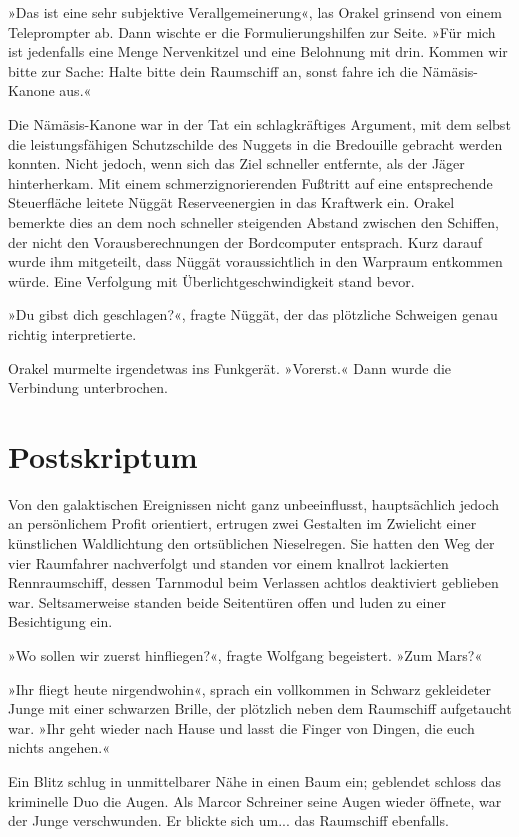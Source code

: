 »Das ist eine sehr subjektive Verallgemeinerung«, las Orakel grinsend von einem Teleprompter ab. Dann wischte er die Formulierungshilfen zur Seite. »Für mich ist jedenfalls eine Menge Nervenkitzel und eine Belohnung mit drin. Kommen wir bitte zur Sache: Halte bitte dein Raumschiff an, sonst fahre ich die Nämäsis-Kanone aus.«

Die Nämäsis-Kanone war in der Tat ein schlagkräftiges Argument, mit dem selbst die leistungsfähigen Schutzschilde des Nuggets in die Bredouille gebracht werden konnten. Nicht jedoch, wenn sich das Ziel schneller entfernte, als der Jäger hinterherkam. Mit einem schmerzignorierenden Fußtritt auf eine entsprechende Steuerfläche leitete Nüggät Reserveenergien in das Kraftwerk ein. Orakel bemerkte dies an dem noch schneller steigenden Abstand zwischen den Schiffen, der nicht den Vorausberechnungen der Bordcomputer entsprach. Kurz darauf wurde ihm mitgeteilt, dass Nüggät voraussichtlich in den Warpraum entkommen würde. Eine Verfolgung mit Überlichtgeschwindigkeit stand bevor.

»Du gibst dich geschlagen?«, fragte Nüggät, der das plötzliche Schweigen genau richtig interpretierte.

Orakel murmelte irgendetwas ins Funkgerät. »Vorerst.« Dann wurde die Verbindung unterbrochen.

\chapter{Postskriptum}

Von den galaktischen Ereignissen nicht ganz unbeeinflusst, hauptsächlich jedoch an persönlichem Profit orientiert, ertrugen zwei Gestalten im Zwielicht einer künstlichen Waldlichtung den ortsüblichen Nieselregen. Sie hatten den Weg der vier Raumfahrer nachverfolgt und standen vor einem knallrot lackierten Rennraumschiff, dessen Tarnmodul beim Verlassen achtlos deaktiviert geblieben war. Seltsamerweise standen beide Seitentüren offen und luden zu einer Besichtigung ein.

»Wo sollen wir zuerst hinfliegen?«, fragte Wolfgang begeistert. »Zum Mars?«

»Ihr fliegt heute nirgendwohin«, sprach ein vollkommen in Schwarz gekleideter Junge mit einer schwarzen Brille, der plötzlich neben dem Raumschiff aufgetaucht war. »Ihr geht wieder nach Hause und lasst die Finger von Dingen, die euch nichts angehen.«

Ein Blitz schlug in unmittelbarer Nähe in einen Baum ein; geblendet schloss das kriminelle Duo die Augen. Als Marcor Schreiner seine Augen wieder öffnete, war der Junge verschwunden. Er blickte sich um... das Raumschiff ebenfalls.

